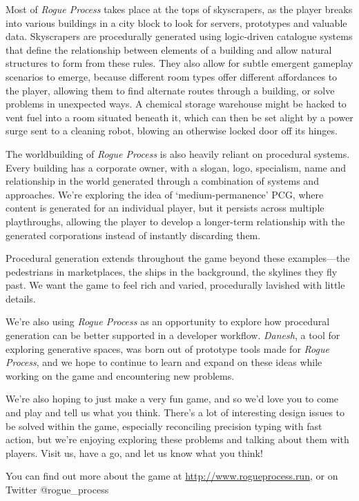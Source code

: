 \documentclass[letterpaper]{article}
\begin{document}
Most of \textit{Rogue Process} takes place at the tops of skyscrapers, as the player breaks into various buildings in a city block to look for servers, prototypes and valuable data.
Skyscrapers are procedurally generated using logic-driven catalogue systems that define the relationship between elements of a building and allow natural structures to form from these rules.
They also allow for subtle emergent gameplay scenarios to emerge, because different room types offer different affordances to the player, allowing them to find alternate routes through a building, or solve problems in unexpected ways.
A chemical storage warehouse might be hacked to vent fuel into a room situated beneath it, which can then be set alight by a power surge sent to a cleaning robot, blowing an otherwise locked door off its hinges.

The worldbuilding of \textit{Rogue Process} is also heavily reliant on procedural systems.
Every building has a corporate owner, with a slogan, logo, specialism, name and relationship in the world generated through a combination of systems and approaches.
We're exploring the idea of `medium-permanence' PCG, where content is generated for an individual player, but it persists across multiple playthroughs, allowing the player to develop a longer-term relationship with the generated corporations instead of instantly discarding them.

Procedural generation extends throughout the game beyond these examples---the pedestrians in marketplaces, the ships in the background, the skylines they fly past.
We want the game to feel rich and varied, procedurally lavished with little details.

We're also using \textit{Rogue Process} as an opportunity to explore how procedural generation can be better supported in a developer workflow.
\textit{Danesh}, a tool for exploring generative spaces, was born out of prototype tools made for \textit{Rogue Process}, and we hope to continue to learn and expand on these ideas while working on the game and encountering new problems.

We're also hoping to just make a very fun game, and so we'd love you to come and play and tell us what you think.
There's a lot of interesting design issues to be solved within the game, especially reconciling precision typing with fast action, but we're enjoying exploring these problems and talking about them with players.
Visit us, have a go, and let us know what you think!

You can find out more about the game at \url{http://www.rogueprocess.run}, or on Twitter @rogue\_process
\end{document}
